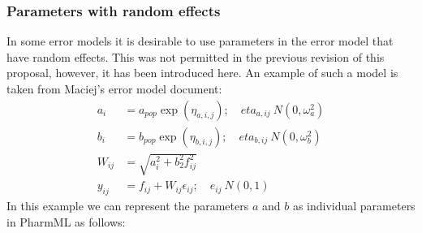 \documentclass[a4paper,10pt]{article}
\newcommand{\pharmml}{PharmML\xspace}
\newcommand{\watchout}{\marginpar{\hspace*{34pt}\raisebox{-0.5ex}{\Large\ding{43}}}}
\begin{document}
\subsubsection{Parameters with random effects}

\watchout In some error models it is desirable to use parameters in the error
model that have random effects. This was not permitted in the previous
revision of this proposal, however, it has been introduced here. An
example of such a model is taken from Maciej's error model document:
%
\begin{align*}
a_i &= a_{\mathit{pop}} \exp(\eta_{a,i,j}); \quad eta_{a,ij} ~ N(0, \omega^2_a)\\
b_i &= b_{\mathit{pop}} \exp(\eta_{b,i,j}); \quad eta_{b,ij} ~ N(0, \omega^2_b)\\
W_{i j} &= \sqrt{a^2_i + b^2_2 f^2_{ij}}\\
y_{ij} &= f_{ij} + W_{ij} \epsilon_{i j}; \quad e_{ij} ~ N(0,1)
\end{align*}
%
In this example we can represent the parameters $a$ and $b$ as
individual parameters in \pharmml as follows:
%
\end{document}
